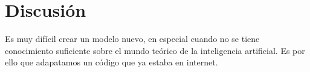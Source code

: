 \documentclass[../main.tex]{subfiles}
\begin{document}
\section{Discusión}
Es muy difícil crear un modelo nuevo, en especial cuando no se tiene conocimiento suficiente sobre el mundo teórico de la inteligencia artificial. Es por ello que adapatamos un código que ya estaba en internet. 
\end{document}
